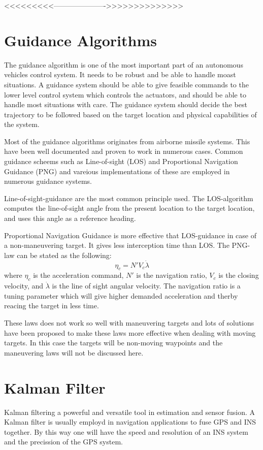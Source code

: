 	<<<<<<<<<---------------------->>>>>>>>>>>>>>

\section{Guidance Algorithms}
	\label{chap1-guidance-alg}
	The guidance algorithm is one of the most important part of an autonomous vehicles control system. It needs to be robust and be able to handle moast situations. A guidance system should be able to give feasible commands to the lower level control system which controls the actuators, and should be able to handle most situations with care. The guidance system should decide the best trajectory to be followed based on the target location and physical capabilities of the system.\cite{GuidanceReview}

	Most of the guidance algorithms originates from airborne missile systems. This have been well documented and proven to work in numerous cases. Common guidance scheems such as Line-of-sight (LOS) and Proportional Navigation Guidance (PNG) and vareious implementations of these are employed in numerous guidance systems.

	Line-of-sight-guidance are the most common principle used. The LOS-algorithm computes the line-of-sight angle from the present location to the target location, and uses this angle as a reference heading.

	Proportional Navigation Guidance is more effective that LOS-guidance in case of a non-maneuvering target. It gives less interception time than LOS. The PNG-law can be stated as the following: \cite{GuidanceReview}
	\begin{equation}
		\eta_c = N' V_c \dot{\lambda}
	\end{equation}
	where $\eta_c$ is the acceleration command, $N'$ is the navigation ratio, $V_c$ is the closing velocity, and $\dot{\lambda}$ is the line of sight angular velocity. The navigation ratio is a tuning parameter which will give higher demanded acceleration and therby reacing the target in less time.

	These laws does not work so well with maneuvering targets and lots of solutions have been proposed to make these laws more effective when dealing with moving targets. In this case the targets will be non-moving waypoints and the maneuvering laws will not be discussed here.
	



\section{Kalman Filter}
	Kalman filtering a powerful and versatile tool in estimation and sensor fusion. A Kalman filter is usually employd in navigation applications to fuse GPS and INS together. By this way one will have the speed and resolution of an INS system and the precission of the GPS system. 

